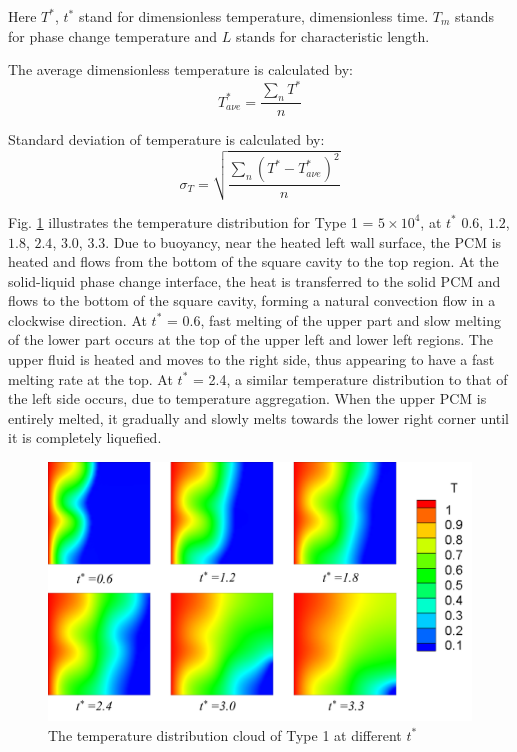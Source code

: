 \documentclass[preprint,12pt]{elsarticle}
\begin{document}
Here $ T^* $, $ t^* $ stand for dimensionless temperature, dimensionless time. $ T_m $ stands for phase change temperature and $ L $ stands for characteristic length.

The average dimensionless temperature is calculated by:
\begin{equation}
	T_{a\nu e}^*=\frac{\sum_nT^*}n
\end{equation}

Standard deviation of temperature is calculated by:
\begin{equation}
	\sigma_T=\sqrt{\frac{\sum_n\left(T^*-T_{a\nu e}^*\right)^2}n}
\end{equation}

Fig. \ref{Fig_yun1} illustrates the temperature distribution for Type 1 = $ 5\times10^4 $, at \textit{$ t^* $} $ 0.6 $, $ 1.2 $, $ 1.8 $, $ 2.4 $, $ 3.0 $, $ 3.3 $. Due to buoyancy, near the heated left wall surface, the PCM is heated and flows from the bottom of the square cavity to the top region. At the solid-liquid phase change interface, the heat is transferred to the solid PCM and flows to the bottom of the square cavity, forming a natural convection flow in a clockwise direction. At \textit{$ t^* $} = 0.6, fast melting of the upper part and slow melting of the lower part occurs at the top of the upper left and lower left regions. The upper fluid is heated and moves to the right side, thus appearing to have a fast melting rate at the top. At \textit{$ t^* $} = 2.4, a similar temperature distribution to that of the left side occurs, due to temperature aggregation. When the upper PCM is entirely melted, it gradually and slowly melts towards the lower right corner until it is completely liquefied.
	\begin{figure}[H]
	\centering
	\includegraphics[scale=0.5]{Fig/yun1.png}
	\caption{The temperature distribution cloud of Type 1 at different $ t^* $} 
	\label{Fig_yun1} 
\end{figure}
\end{document}

